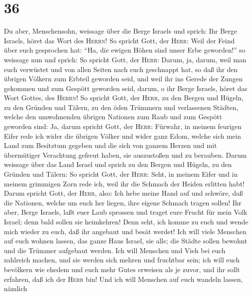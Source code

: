 \hypertarget{section-35}{%
\section{36}\label{section-35}}

 Du aber, Menschensohn, weissage über die Berge Israels
und sprich: Ihr Berge Israels, höret das Wort des \textsc{Herrn}!
 So spricht Gott, der \textsc{Herr}: Weil der Feind über
euch gesprochen hat: ``Ha, die ewigen Höhen sind unser Erbe geworden!''
 so weissage nun und sprich: So spricht Gott, der
\textsc{Herr}: Darum, ja, darum, weil man euch verwüstet und von allen
Seiten nach euch geschnappt hat, so daß ihr den übrigen Völkern zum
Erbteil geworden seid, und weil ihr ins Gerede der Zungen gekommen und
zum Gespött geworden seid,  darum, o ihr Berge Israels,
höret das Wort Gottes, des \textsc{Herrn}! So spricht Gott, der
\textsc{Herr}, zu den Bergen und Hügeln, zu den Gründen und Tälern, zu
den öden Trümmern und verlassenen Städten, welche den umwohnenden
übrigen Nationen zum Raub und zum Gespött geworden sind: 
Ja, darum spricht Gott, der \textsc{Herr}: Fürwahr, in meinem feurigen
Eifer rede ich wider die übrigen Völker und wider ganz Edom, welche sich
mein Land zum Besitztum gegeben und die sich von ganzem Herzen und mit
übermütiger Verachtung gefreut haben, sie auszustoßen und zu berauben.
 Darum weissage über das Land Israel und sprich zu den
Bergen und Hügeln, zu den Gründen und Tälern: So spricht Gott, der
\textsc{Herr}: Seht, in meinem Eifer und in meinem grimmigen Zorn rede
ich, weil ihr die Schmach der Heiden erlitten habt!  Darum
spricht Gott, der \textsc{Herr}, also: Ich hebe meine Hand auf und
schwöre, daß die Nationen, welche um euch her liegen, ihre eigene
Schmach tragen sollen!  Ihr aber, Berge Israels, laßt euer
Laub sprossen und traget eure Frucht für mein Volk Israel; denn bald
sollen sie heimkehren!  Denn seht, ich komme zu euch und
wende mich wieder zu euch, daß ihr angebaut und besät werdet!
 Ich will viele Menschen auf euch wohnen lassen, das
ganze Haus Israel, sie alle; die Städte sollen bewohnt und die Trümmer
aufgebaut werden.  Ich will Menschen und Vieh bei euch
zahlreich machen, und sie werden sich mehren und fruchtbar sein; ich
will euch bevölkern wie ehedem und euch mehr Gutes erweisen als je
zuvor, und ihr sollt erfahren, daß ich der \textsc{Herr} bin!
 Und ich will Menschen auf euch wandeln lassen, nämlich
